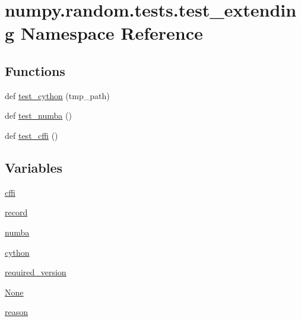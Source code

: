 \hypertarget{namespacenumpy_1_1random_1_1tests_1_1test__extending}{}\section{numpy.\+random.\+tests.\+test\+\_\+extending Namespace Reference}
\label{namespacenumpy_1_1random_1_1tests_1_1test__extending}
\subsection*{Functions}
\begin{DoxyCompactItemize}
\item 
def \hyperlink{namespacenumpy_1_1random_1_1tests_1_1test__extending_a791fca52619658e81f757c33f3695ed2}{test\+\_\+cython} (tmp\+\_\+path)
\item 
def \hyperlink{namespacenumpy_1_1random_1_1tests_1_1test__extending_aee0ef9b2d3e287deafd9df6383ddd776}{test\+\_\+numba} ()
\item 
def \hyperlink{namespacenumpy_1_1random_1_1tests_1_1test__extending_a56b8a73576eb9cf2c5066766abdf3c9f}{test\+\_\+cffi} ()
\end{DoxyCompactItemize}
\subsection*{Variables}
\begin{DoxyCompactItemize}
\item 
\hyperlink{namespacenumpy_1_1random_1_1tests_1_1test__extending_a3f2f0bccd562081df7b9818f0f7fc473}{cffi}
\item 
\hyperlink{namespacenumpy_1_1random_1_1tests_1_1test__extending_ab6af1faa1fd16fffa4e4a26973f2588f}{record}
\item 
\hyperlink{namespacenumpy_1_1random_1_1tests_1_1test__extending_abb9730896c22237ce8fdb20c8fc776da}{numba}
\item 
\hyperlink{namespacenumpy_1_1random_1_1tests_1_1test__extending_a2c1f8810760f9bf6950df70788964883}{cython}
\item 
\hyperlink{namespacenumpy_1_1random_1_1tests_1_1test__extending_add084d9bceaad9bc06648cbe34f4c76e}{required\+\_\+version}
\item 
\hyperlink{namespacenumpy_1_1random_1_1tests_1_1test__extending_a9e20a052e697b0345e8dcfd0efd90dd1}{None}
\item 
\hyperlink{namespacenumpy_1_1random_1_1tests_1_1test__extending_aac7c56864507a49792554e35927e4edf}{reason}
\end{DoxyCompactItemize}


